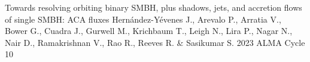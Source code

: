 
\begin{cvpublications}{}

	 {Towards resolving orbiting binary SMBH, plus shadows, jets, and accretion flows of single SMBH: ACA fluxes}
	 {Hernández-Yévenes J., Arevalo P., Arratia V., Bower G., Cuadra J., Gurwell M., Krichbaum T., Leigh N., Lira P., Nagar N., Nair D., Ramakrishnan V., Rao R., Reeves R. \& Sasikumar S.}
	 {2023}
     {ALMA Cycle 10}
     {}

\end{cvpublications}